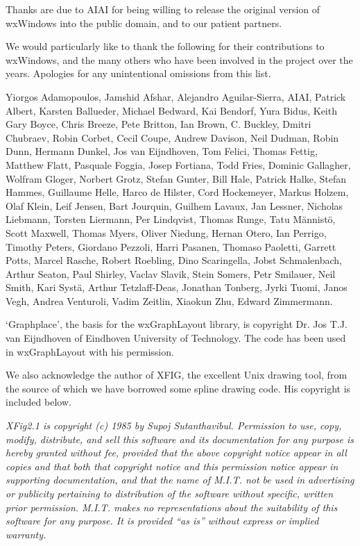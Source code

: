 Thanks are due to AIAI for being willing to release the original version of
wxWindows into the public domain, and to our patient partners.

We would particularly like to thank the following for their contributions to wxWindows, and the many others who have been involved in
the project over the years. Apologies for any unintentional omissions from this list. 
 
Yiorgos Adamopoulos, Jamshid Afshar, Alejandro Aguilar-Sierra, AIAI, Patrick Albert, Karsten Ballueder, Michael Bedward, Kai Bendorf, Yura Bidus, Keith 
Gary Boyce, Chris Breeze, Pete Britton, Ian Brown, C. Buckley, Dmitri Chubraev, Robin Corbet, Cecil Coupe, Andrew Davison, Neil Dudman, Robin 
Dunn, Hermann Dunkel, Jos van Eijndhoven, Tom Felici, Thomas Fettig, Matthew Flatt, Pasquale Foggia, Josep Fortiana, Todd Fries, Dominic Gallagher, 
Wolfram Gloger, Norbert Grotz, Stefan Gunter, Bill Hale, Patrick Halke, Stefan Hammes, Guillaume Helle, Harco de Hilster, Cord Hockemeyer, Markus 
Holzem, Olaf Klein, Leif Jensen, Bart Jourquin, Guilhem Lavaux, Jan Lessner, Nicholas Liebmann, Torsten Liermann, Per Lindqvist, Thomas Runge, Tatu
M\"{a}nnist\"{o}, Scott Maxwell, Thomas Myers, Oliver Niedung, Hernan Otero, Ian Perrigo, Timothy Peters, Giordano Pezzoli, Harri Pasanen, Thomaso Paoletti, 
Garrett Potts, Marcel Rasche, Robert Roebling, Dino Scaringella, Jobst Schmalenbach, Arthur Seaton, Paul Shirley, Vaclav Slavik, Stein Somers, Petr Smilauer, Neil Smith, 
Kari Syst\"{a}, Arthur Tetzlaff-Deas, Jonathan Tonberg, Jyrki Tuomi, Janos Vegh, Andrea Venturoli, Vadim Zeitlin, Xiaokun Zhu, Edward Zimmermann.

`Graphplace', the basis for the wxGraphLayout library, is copyright Dr. Jos
T.J. van Eijndhoven of Eindhoven University of Technology. The code has
been used in wxGraphLayout with his permission.

We also acknowledge the author of XFIG, the excellent Unix drawing tool,
from the source of which we have borrowed some spline drawing code.
His copyright is included below.

{\it XFig2.1 is copyright (c) 1985 by Supoj Sutanthavibul. Permission to
use, copy, modify, distribute, and sell this software and its
documentation for any purpose is hereby granted without fee, provided
that the above copyright notice appear in all copies and that both that
copyright notice and this permission notice appear in supporting
documentation, and that the name of M.I.T. not be used in advertising or
publicity pertaining to distribution of the software without specific,
written prior permission.  M.I.T. makes no representations about the
suitability of this software for any purpose.  It is provided ``as is''
without express or implied warranty.}

